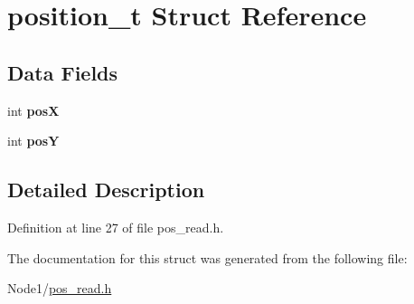 \hypertarget{structposition__t}{}\section{position\+\_\+t Struct Reference}
\label{structposition__t}
\subsection*{Data Fields}
\begin{DoxyCompactItemize}
\item 
\mbox{\label{structposition__t_a2773910628900fe447b85cbb8addf8ce}} 
int {\bfseries posX}
\item 
\mbox{\label{structposition__t_aecb7c72ae90a8562bebe2664220bfe89}} 
int {\bfseries posY}
\end{DoxyCompactItemize}


\subsection{Detailed Description}


Definition at line 27 of file pos\+\_\+read.\+h.



The documentation for this struct was generated from the following file\+:\begin{DoxyCompactItemize}
\item 
Node1/\hyperlink{pos__read_8h}{pos\+\_\+read.\+h}\end{DoxyCompactItemize}
